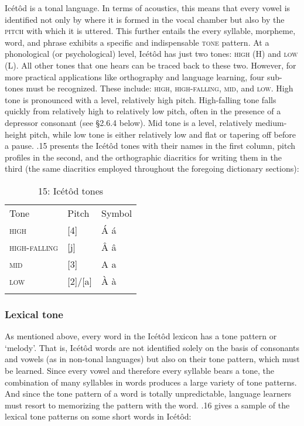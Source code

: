 Icétôd is a tonal language. In terms of acoustics, this means that every vowel is identified not only by where it is formed in the vocal chamber but also by the \textsc{pitch} with which it is uttered. This further entails the every syllable, morpheme, word, and phrase exhibits a specific and indispensable \textsc{tone} pattern. At a phonological (or psychological) level, Icétôd has just two tones: \textsc{high} (H) and \textsc{low (L)}. All other tones that one hears can be traced back to these two. However, for more practical applications like orthography and language learning, four sub-tones must be recognized. These include: \textsc{high}, \textsc{high-falling}, \textsc{mid}, and \textsc{low}. High tone is pronounced with a level, relatively high pitch. High-falling tone falls quickly from relatively high to relatively low pitch, often in the presence of a depressor consonant (see §2.6.4 below). Mid tone is a level, relatively medium-height pitch, while low tone is either relatively low and flat or tapering off before a pause. .15 presents the Icétôd tones with their names in the first column, pitch profiles in the second, and the orthographic diacritics for writing them in the third (the same diacritics employed throughout the foregoing dictionary sections):


\begin{table}
\caption{15: Icétôd tones}
\label{tab:2}


\begin{tabularx}{\textwidth}{XXX}
\lsptoprule

Tone & Pitch & Symbol\\
\textsc{high} & [4] & Á á\\
\textsc{high-falling} & [j] & \^{A} â\\
\textsc{mid} & [3] & A a\\
\textsc{low} & [2]/[a] & \`{A} à\\
\lspbottomrule
\end{tabularx}
\end{table}


\subsubsection{Lexical tone}

As mentioned above, every word in the Icétôd lexicon has a tone pattern or ‘melody’. That is, Icétôd words are not identified solely on the basis of consonants and vowels (as in non-tonal languages) but also on their tone pattern, which must be learned. Since every vowel and therefore every syllable bears a tone, the combination of many syllables in words produces a large variety of tone patterns. And since the tone pattern of a word is totally unpredictable, language learners must resort to memorizing the pattern with the word. .16 gives a sample of the lexical tone patterns on some short words in Icétôd:


